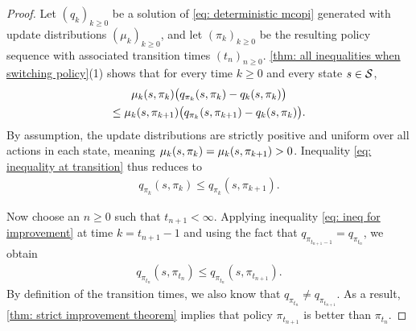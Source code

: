 \begin{proof}
Let $(q_k)_{k \ge 0}$ be a solution of \eqref{eq: deterministic mcopi} generated with update distributions $(\mu_k)_{k \ge 0}$, and let $(\pi_k)_{k \ge 0}$ be the resulting policy sequence with associated transition times $(t_n)_{n \ge 0}$.
\autoref{thm: all inequalities when switching policy}(1) shows that for every time $k \ge 0$ and every state $s \in \mathcal{S}$,
\begin{multline}
\label{eq: inequality at transition}
\mu_k(s, \pi_k) \big( q_{\pi_k}(s, \pi_k) - q_k(s, \pi_k) \big)
\\
    \leq
    \mu_k(s, \pi_{k+1}) \big( q_{\pi_k}(s, \pi_{k+1}) - q_k(s, \pi_k) \big) .
\end{multline}
By assumption, the update distributions are strictly positive and uniform over all actions in each state, meaning
\(\mu_k(s,\pi_k)=\mu_k(s,\pi_{k+1})>0\).
Inequality \eqref{eq: inequality at transition} thus reduces to
\begin{align}
    \label{eq: ineq for improvement}
    q_{\pi_k}(s,\pi_k) \le q_{\pi_k}(s,\pi_{k+1}).
\end{align}

Now choose an $n \ge 0$ such that $t_{n+1}<\infty$. Applying inequality \eqref{eq: ineq for improvement} at time $k=t_{n+1}-1$ and using the fact that $q_{\pi_{t_{n+1}-1}}=q_{\pi_{t_n}}$, we obtain
\begin{align*}
    q_{\pi_{t_{n}}}(s,\pi_{t_n}) \le q_{\pi_{t_n}}(s,\pi_{t_{n+1}}).
\end{align*}
By definition of the transition times, we also know that $q_{\pi_{t_n}} \neq q_{\pi_{t_{n+1}}}$.
As a result, \autoref{thm: strict improvement theorem} implies that policy $\pi_{t_{n+1}}$ is better than $\pi_{t_n}$.
\end{proof}

